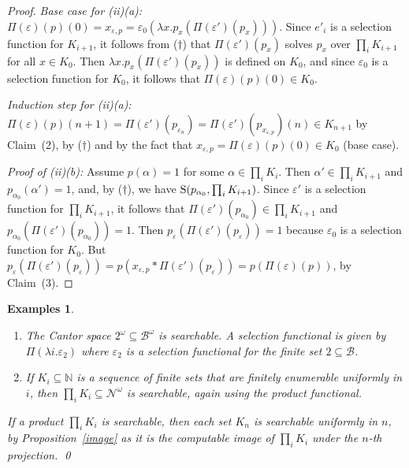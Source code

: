 \documentclass{LMCS}
\newcommand{\e}{\varepsilon}
\newtheorem{Examples}[thm]{Examples}
\newenvironment{examples}{\begin{Examples}}{\end{Examples}}
\newcommand{\N}{\mathbb{N}}
\newcommand{\Bool}{2}\newcommand{\Sierp}{\mathcal{S}}
\newcommand{\pN}{\mathcal{N}}
\newcommand{\pBool}{\mathcal{B}}
\newcommand{\True}{1}\newcommand{\False}{0}\newcommand{\domain}[1]{{\D_{#1}}}
\newcommand{\D}{D}
\begin{document}
\begin{proof}
\medskip
\noindent
\emph{Base case for (ii)(a):} $\Pi(\e)(p)(0) = x_{\e,p} = \e_0
(\lambda x.p_x(\Pi(\e')(p_x)))$.  Since $e'_i$ is a selection
function for $K_{i+1}$, it follows from ($\dagger$) that
$\Pi(\e')(p_x)$ solves $p_x$ over $\prod_i K_{i+1}$ for all $x \in
K_0$. Then $\lambda x.p_x(\Pi(\e')(p_x))$ is defined on $K_0$, and
since $\e_0$ is a selection function for $K_0$, it follows that
$\Pi(\e)(p)(0) \in K_0$.

\medskip
\noindent
\emph{Induction step for (ii)(a):} $\Pi(\e)(p)(n+1) =
\Pi(\e')(p_{\e_n}) = \Pi(\e')(p_{x_{\e,p}})(n) \in K_{n+1} $ by
Claim~(2), by ($\dagger$) and by the fact that $x_{\e,p} = \Pi(\e)(p)(0)
\in K_0$ (base case).

\medskip
\noindent
\emph{Proof of (ii)(b):} Assume $p(\alpha) = \True$ for some $\alpha
\in \prod_i K_i$.  Then $\alpha' \in \prod_i K_{i+1}$ and
$p_{\alpha_0}(\alpha') = \True$, and, by ($\dagger$), we have
$\operatorname{S}(p_{\alpha_0},\prod_i K_{i+1})$. Since $\e'$ is a selection
function for $\prod_i K_{i+1}$, it follows that $\Pi(\e')
(p_{\alpha_0}) \in \prod_i K_{i+1}$ and $p_{\alpha_0}(\Pi(\e')
(p_{\alpha_0})) = \True$.  Then $p_\e(\Pi(\e')(p_\e)) = \True$ because
$\e_0$ is a selection function for $K_0$. But $p_\e(\Pi(\e')(p_\e)) =
p(x_{\e,p} * \Pi(\e')(p_\e)) = p(\Pi(\e)(p))$, by Claim~(3).
\end{proof}

\pagebreak[3]
\begin{examples}
  \leavevmode
  \begin{enumerate}
  \item The Cantor space $2^\omega \subseteq \pBool^\omega$ is
    searchable.  A selection functional is given by $\Pi(\lambda
    i.\e_{\Bool})$ where $\e_{\Bool}$ is a selection
    functional for the finite set $\Bool \subseteq \pBool$.
  \item If $K_i \subseteq \N$ is a sequence of finite sets that are
    finitely enumerable uniformly in $i$, then $\prod_i K_i \subseteq
    \pN^\omega$ is searchable, again using the product functional.
  \end{enumerate}
  If a product $\prod_i K_i$ is searchable, then each set $K_n$ is
  searchable uniformly in $n$, by Proposition~\ref{image} as it is the
  computable image of $\prod_i K_i$ under the $n$-th projection.  \qed
\end{examples}
\end{document}
